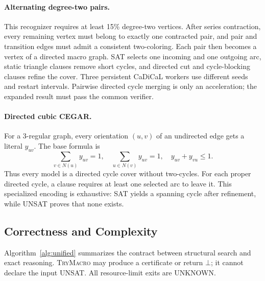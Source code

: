 \documentclass[sigconf,anonymous]{aamas}
\begin{document}
\paragraph{Alternating degree-two pairs.}
This recognizer requires at least 15\% degree-two vertices. After series
contraction, every remaining vertex must belong to exactly one contracted
pair, and pair and transition edges must admit a consistent two-coloring.
Each pair then becomes a vertex of a directed macro graph. SAT selects
one incoming and one outgoing arc, static triangle clauses remove short
cycles, and directed cut and cycle-blocking clauses refine the cover.
Three persistent CaDiCaL workers use different seeds and restart
intervals. Pairwise directed cycle merging is only an acceleration; the
expanded result must pass the common verifier.

\paragraph{Directed cubic CEGAR.}
For a 3-regular graph, every orientation $(u,v)$ of an undirected edge
gets a literal $y_{uv}$. The base formula is
\begin{equation}
 \sum_{v\in N(u)}y_{uv}=1,\quad
 \sum_{u\in N(v)}y_{uv}=1,\quad
 y_{uv}+y_{vu}\leq 1.
 \label{eq:directed}
\end{equation}
Thus every model is a directed cycle cover without two-cycles. For each
proper directed cycle, a clause requires at least one selected arc to
leave it. This specialized encoding is exhaustive: SAT yields a spanning
cycle after refinement, while UNSAT proves that none exists.

\subsection{Correctness and Complexity}
\label{sec:correctness}

Algorithm~\ref{alg:unified} summarizes the contract between structural
search and exact reasoning. \textsc{TryMacro} may produce a certificate
or return $\bot$; it cannot declare the input UNSAT. All resource-limit
exits are UNKNOWN.
\end{document}
